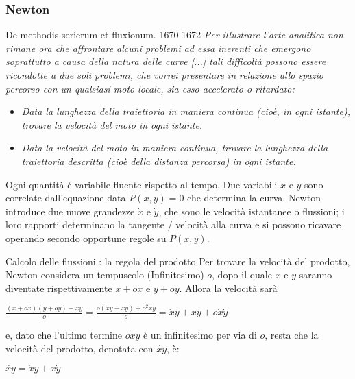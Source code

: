 \begin{frame}[label=Newton]
  \frametitle{Newton}

  \begin{block}{De methodis serierum et fluxionum. 1670-1672}
    \textit{Per illustrare l'arte analitica non rimane ora che affrontare alcuni problemi
      ad essa inerenti che emergono soprattutto a causa della natura delle curve [...]
      tali difficoltà possono essere ricondotte a due soli problemi, che vorrei presentare
      in relazione allo spazio percorso con un qualsiasi moto locale, sia esso accelerato
      o ritardato:}

    \begin{itemize}
      \item
            \textit{Data la lunghezza della traiettoria in maniera continua (cioè, in ogni istante),
              trovare la velocità del moto in ogni istante.}
      \item
            \textit{Data la velocità del moto in maniera continua, trovare la lunghezza della traiettoria
              descritta (cioè della distanza percorsa) in ogni istante.}
    \end{itemize}

    \cite[Giusti]{Giusti} Ogni quantità è variabile \alert{fluente} rispetto al tempo. Due variabili $x$ e $y$ sono correlate 
    dall'equazione data $P(x,y)=0$ che determina la curva. 
    Newton introduce due nuove grandezze $\dot{x}$ e $\dot{y}$, che sono le velocità istantanee
    o \alert{flussioni}; i loro rapporti determinano la tangente / velocità alla curva e si possono ricavare operando
    \alert{secondo opportune regole} su $P(x,y)$.
  \end{block}
  \begin{exampleblock}{Calcolo delle flussioni : la regola del prodotto}
    Per trovare la velocità del prodotto, Newton considera un tempuscolo (Infinitesimo) $o$, dopo il quale $x$ e $y$ saranno diventate 
    rispettivamente $x+o\dot{x}$ e $y+o\dot{y}$. Allora la velocità sarà
    \begin{center}
      $\frac{(x+o\dot{x})(y+o\dot{y}) - xy}{o} = \frac{o(\dot{x}y + x\dot{y}) + o^2\dot{x}\dot{y}}{o} = \dot{x}y + x\dot{y} + o\dot{x}\dot{y}$
    \end{center}
    e, dato che l'ultimo termine $o\dot{x}\dot{y}$ è un infinitesimo per via di $o$, resta che la velocità del prodotto,
    denotata con $\dot{xy}$, è:
    \begin{center}
        $\dot{xy} = \dot{x}y + x\dot{y}$
    \end{center}

  \end{exampleblock}




\end{frame}

